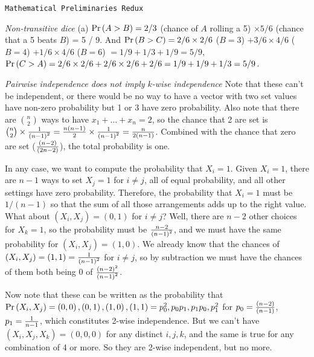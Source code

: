 \def\newstep#1{\smallskip \noindent {\bf #1}}
\def\newprob#1{\vskip 0.12in \noindent {\bf #1}}

\topglue 0.5in
\centerline{\tt Mathematical Preliminaries Redux}
\vskip 0.3in


 {\it Non-transitive dice}\hfil\break
(a) ${\rm Pr}\left(A > B\right) = 2 / 3$ (chance of $A$ rolling a 5) $\times 5 / 6$
(chance that a 5 beats $B$) = 5 / 9.  And ${\rm Pr}\left(B > C\right) = 2 / 6 \times 2 / 6$
($B = 3$) $ + 3 / 6 \times 4 / 6$ ($B = 4$) $+ 1 / 6 \times 4 / 6$ ($B = 6$)
$ = 1 / 9 + 1 / 3 + 1 / 9 = 5 / 9$, ${\rm Pr}\left(C > A\right) = 2 / 6 \times 2 / 6 +
2 / 6 \times 2 / 6 + 2 / 6 = 1 / 9 + 1 / 9 + 1 / 3 = 5 / 9$.\hfil\break

\newprob{Problem 6} {\it Pairwise independence does not imply $k$-wise independence}\hfil\break
Note that these can't be independent, or there would be no way to have a vector
with two set values have non-zero probability but 1 or 3 have zero probability.
Also note that there are $n \choose 2$ ways to have $x_1 + \ldots + x_n = 2$,
so the chance that 2 are set is ${n \choose 2} \times {1 \over \left(n - 1\right)^2} =
{n \left(n - 1\right) \over 2} \times {1 \over \left(n - 1\right)^2} = {n \over 2 \left(n - 1\right)}$.
Combined with the chance that zero are set ($\left(n - 2\right) \over \left(2 n - 2\right)$),
the total probability is one.

In any case, we want to compute the probability that $X_i = 1$.  Given $X_i = 1$, there are $n - 1$
ways to set $X_j = 1$ for $i \neq j$, all of equal probability, and all other settings have zero probability.
Therefore, the probability that $X_i = 1$ must be $1 / \left(n - 1\right)$ so that the sum of
all those arrangements adds up to the right value.  What about $\left(X_i, X_j\right) = \left(0, 1\right)$ 
for $i \neq j$? Well, there are $n-2$ other choices for $X_k = 1$, so the probability
must be $n - 2 \over \left(n - 1\right)^2$, and we must have the same probability
for $\left(X_i, X_j\right) = \left(1, 0\right)$.  We already know that the chances of
$\left(X_i, X_j\right) = \left(1, 1\right) = {1 \over \left(n - 1\right)^2}$ for $i \neq j$,
so by subtraction we must have the chances of them both being 0 of
$\left(n - 2\right)^2 \over \left(n - 1\right)^2$.

Now note that these can be written as the probability that ${\rm Pr} \left(X_i, X_j\right) = 
\left(0, 0\right), \left(0, 1\right), \left(1, 0\right), \left(1, 1\right) =
p_0^2, p_0 p_1, p_1 p_0, p_1^2$ for $p_0 = {\left( n - 2\right) \over \left(n - 1\right)}$,
$p_1 = {1 \over n - 1}$, which constitutes 2-wise independence.
But we can't have $\left(X_i, X_j, X_k\right) = \left(0, 0, 0\right)$ for any distinct
$i, j, k$, and the same is true for any combination of 4 or more.  So they are 2-wise
independent, but no more.

